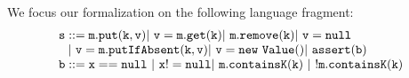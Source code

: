 %
We focus our formalization on the following language fragment:
\[\begin{array}{l}
		\mathtt{s ::= m.put(k, v)} \mathtt{|\ v=m.get(k)}
		\mathtt{|\ m.remove(k)} \mathtt{|\ v=null}\\
		\hspace{7.5pt} \mathtt{|\ v=m.putIfAbsent(k, v)} \mathtt{|\ v=new\ Value()}  \mathtt{|\ assert(b)}\\
		\mathtt{b ::= x==null\ |\  x!=null}
		\mathtt{|\ m.containsK(k)\ |\ ! m.containsK(k)}
\end{array}\]
